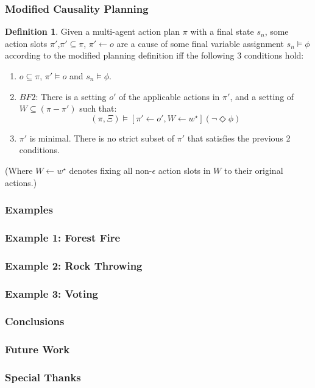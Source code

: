 \documentclass{beamer}
\theoremstyle{plain}
\theoremstyle{definition}
\newtheorem{defn}[thm]{Definition} %
\begin{document}
\begin{frame}
\frametitle{Modified Causality Planning}
\begin{defn}
Given a multi-agent action plan $\pi$ with a final state $s_n$, some action slots $\pi'$,$\pi' \subseteq \pi$, $\pi' \leftarrow o$ are a cause of some final variable assignment $s_n \models \phi$ according to the modified planning definition iff the following 3 conditions hold:
\begin{enumerate}
\item  $o \subseteq \pi$, $\pi' \models o$ and $s_n \models \phi$.
\item $BF2$: There is a setting $o'$ of the applicable actions in $\pi'$, and a setting of $W \subseteq (\pi  - \pi')$ such that:
\[
(\pi, \Xi) \models [\pi' \leftarrow o', W \leftarrow w^\star](\lnot \Diamond \phi)
\]
\item $\pi'$ is minimal. There is no strict subset of $\pi'$ that satisfies the previous 2 conditions.
\end{enumerate}


(Where $W\leftarrow w^\star$ denotes fixing all non-$\epsilon$ action slots in $W$ to their original actions.)

\end{defn}

\end{frame}

\begin{frame}
\frametitle{Examples}

\end{frame}


\begin{frame}
\frametitle{Example 1: Forest Fire}

\end{frame}


\begin{frame}
\frametitle{Example 2: Rock Throwing}

\end{frame}

\begin{frame}
\frametitle{Example 3: Voting}

\end{frame}


\begin{frame}
\frametitle{Conclusions}

\end{frame}


\begin{frame}
\frametitle{Future Work}

\end{frame}

\begin{frame}
\frametitle{Special Thanks}

\end{frame}
\end{document}
